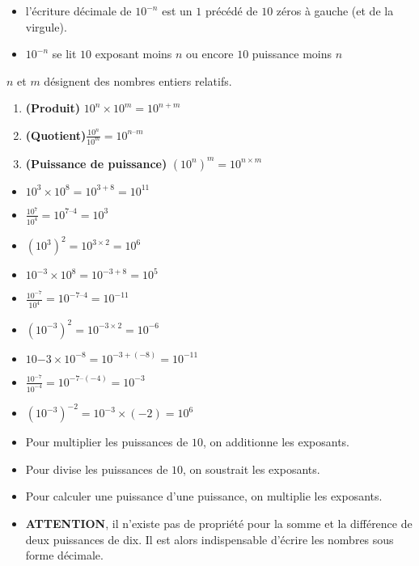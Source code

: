 \documentclass[10pt]{article}
\begin{document}
{\begin{Rq}
\begin{itemize}
\item l'écriture décimale de $10^{-n}$ est un $1$ précédé de $10$ \og zéros \fg{} à gauche (et de la virgule).
\item $10^{-n}$ se lit $10$ \og exposant moins \fg{} $n$ ou encore $10$ \og puissance moins \fg{} $n$
\end{itemize}	 
\end{Rq}

\begin{shaded}	 
\begin{Pps}
$n$ et $m$ désignent des nombres entiers relatifs.
\begin{enumerate}
\item \textbf{(Produit)}  
$10^n\times 10^m= 10^{n+m}$
\item \textbf{(Quotient)}$\frac{10^n}{10^m}= 10^{n–m}$	   
\item \textbf{(Puissance de puissance)}
 $\left(10^n\right)^m= 10^{n\times m}$
\end{enumerate}
\end{Pps}
\end{shaded}
	   
\begin{Ex}	   
\begin{itemize}
\item $10^3\times 10^8= 10^{3+8}= 10^{11}$
\item $\frac{10^7}{10^4}=  10^{7–4}= 10^3$
\item $\left(10^3\right)^2= 10^{3\times 2}= 10^6$	   
\item $10^{-3}\times 10^8= 10^{-3 + 8}= 10^5$
\item $\frac{10^{-7}}{10^4}		= 10^{-7 – 4}= 10^{-11}$
\item $\left(10^{-3}\right)^2= 10^{-3 \times 2}= 10^{-6}$	   
\item $10{-3}\times 10^{-8}= 10^{-3 + (-8)}= 10^{-11}$
\item $\frac{10^{-7}}{10^{-4}}= 10^{-7 – \left(-4\right)}= 10^{-3}$		\item ${\left(10^{-3}\right)}^{-2}= 10^{-3} \times \left(-2\right)= 10^6$
\end{itemize}
\end{Ex}
	   
\begin{Rq}
\begin{itemize}	
\item Pour multiplier les puissances de $10$, on additionne les exposants.	\item Pour divise les puissances de $10$, on soustrait les exposants.		\item Pour calculer une puissance d'une puissance, on multiplie les exposants.
\item \textbf{ATTENTION}, il n'existe pas de propriété pour la somme et la différence de deux puissances de dix.
Il est alors indispensable d'écrire les nombres sous forme décimale.
\end{itemize}
\end{Rq}		

}
\end{document}
